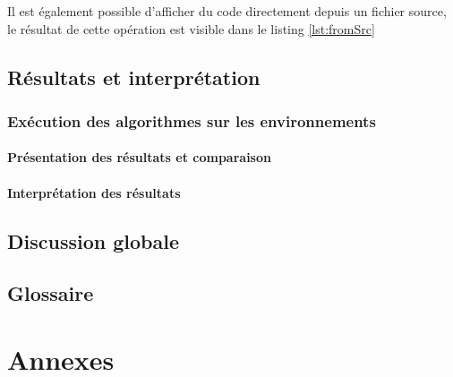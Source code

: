 \documentclass[pidr]{tnreport}
\begin{document}
Il est également possible d'afficher du code directement depuis un fichier source, le résultat de cette opération est visible dans le listing \ref{lst:fromSrc}


\chapter{Résultats et interprétation}
	
	\section{Exécution des algorithmes sur les environnements}
		
		\subsection{Présentation des résultats et comparaison}
		
		\subsection{Interprétation des résultats}

\chapter{Discussion globale}

\clearpage
\renewcommand{\tocbibname}{Bibliographie / Webographie}


\clearpage

\listoffigures
\clearpage

\listoftables
\clearpage

\lstlistoflistings
\clearpage

\chapter*{Glossaire}

\clearpage
\renewcommand{\thesubsection}{\Roman{subsection}}

\appendix
\part*{Annexes}
\clearpage
\end{document}
